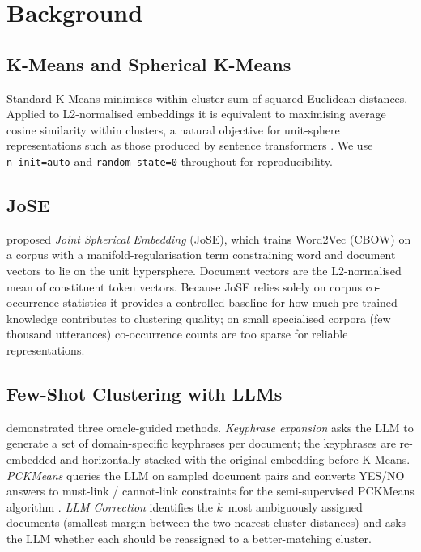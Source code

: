 \documentclass[10pt,twocolumn,a4paper]{article}
\begin{document}
\section{Background}
\label{sec:background}

\subsection{K-Means and Spherical K-Means}

Standard K-Means minimises within-cluster sum of squared Euclidean distances.
Applied to L2-normalised embeddings it is equivalent to maximising average
cosine similarity within clusters, a natural objective for unit-sphere
representations such as those produced by sentence transformers
\citep{reimers2019sentence}.
We use \texttt{n\_init=auto} and \texttt{random\_state=0} throughout for
reproducibility.

\subsection{JoSE}

\citet{meng2019spherical} proposed \emph{Joint Spherical Embedding} (JoSE),
which trains Word2Vec (CBOW) on a corpus with a manifold-regularisation term
constraining word and document vectors to lie on the unit hypersphere.
Document vectors are the L2-normalised mean of constituent token vectors.
Because JoSE relies solely on corpus co-occurrence statistics it provides a
controlled baseline for how much pre-trained knowledge contributes to
clustering quality; on small specialised corpora (few thousand utterances)
co-occurrence counts are too sparse for reliable representations.

\subsection{Few-Shot Clustering with LLMs}

\citet{viswanathan2023large} demonstrated three oracle-guided methods.
\emph{Keyphrase expansion} asks the LLM to generate a set of domain-specific
keyphrases per document; the keyphrases are re-embedded and horizontally
stacked with the original embedding before K-Means.
\emph{PCKMeans} queries the LLM on sampled document pairs and converts
YES/NO answers to must-link / cannot-link constraints for the
semi-supervised PCKMeans algorithm \citep{basu2004active}.
\emph{LLM Correction} identifies the $k$~most ambiguously assigned documents
(smallest margin between the two nearest cluster distances) and asks the LLM
whether each should be reassigned to a better-matching cluster.
\end{document}
